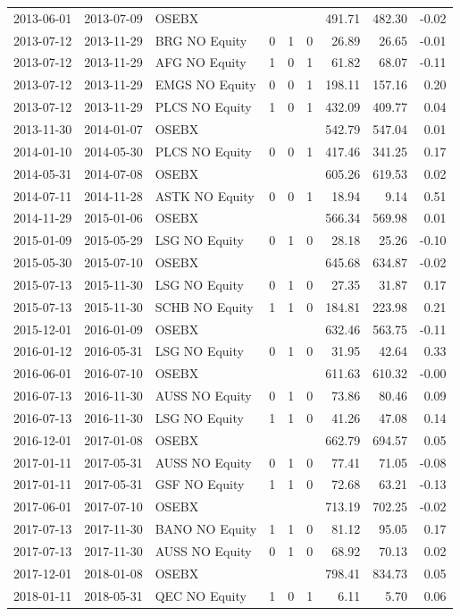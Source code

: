 \begin{appendices}
\begin{table}[h]
\begin{tabular}{llllllrrr}
   2013-06-01 & 2013-07-09 & OSEBX &  &  &  & 491.71 & 482.30 & -0.02 \\ 
   2013-07-12 & 2013-11-29 & BRG NO Equity & 0 & 1 & 0 & 26.89 & 26.65 & -0.01 \\ 
   2013-07-12 & 2013-11-29 & AFG NO Equity & 1 & 0 & 1 & 61.82 & 68.07 & -0.11 \\ 
   2013-07-12 & 2013-11-29 & EMGS NO Equity & 0 & 0 & 1 & 198.11 & 157.16 & 0.20 \\ 
   2013-07-12 & 2013-11-29 & PLCS NO Equity & 1 & 0 & 1 & 432.09 & 409.77 & 0.04 \\ 
   2013-11-30 & 2014-01-07 & OSEBX &  &  &  & 542.79 & 547.04 & 0.01 \\ 
   2014-01-10 & 2014-05-30 & PLCS NO Equity & 0 & 0 & 1 & 417.46 & 341.25 & 0.17 \\ 
   2014-05-31 & 2014-07-08 & OSEBX &  &  &  & 605.26 & 619.53 & 0.02 \\ 
   2014-07-11 & 2014-11-28 & ASTK NO Equity & 0 & 0 & 1 & 18.94 & 9.14 & 0.51 \\ 
   2014-11-29 & 2015-01-06 & OSEBX &  &  &  & 566.34 & 569.98 & 0.01 \\ 
   2015-01-09 & 2015-05-29 & LSG NO Equity & 0 & 1 & 0 & 28.18 & 25.26 & -0.10 \\ 
   2015-05-30 & 2015-07-10 & OSEBX &  &  &  & 645.68 & 634.87 & -0.02 \\ 
   2015-07-13 & 2015-11-30 & LSG NO Equity & 0 & 1 & 0 & 27.35 & 31.87 & 0.17 \\ 
   2015-07-13 & 2015-11-30 & SCHB NO Equity & 1 & 1 & 0 & 184.81 & 223.98 & 0.21 \\ 
   2015-12-01 & 2016-01-09 & OSEBX &  &  &  & 632.46 & 563.75 & -0.11 \\ 
   2016-01-12 & 2016-05-31 & LSG NO Equity & 0 & 1 & 0 & 31.95 & 42.64 & 0.33 \\ 
   2016-06-01 & 2016-07-10 & OSEBX &  &  &  & 611.63 & 610.32 & -0.00 \\ 
   2016-07-13 & 2016-11-30 & AUSS NO Equity & 0 & 1 & 0 & 73.86 & 80.46 & 0.09 \\ 
   2016-07-13 & 2016-11-30 & LSG NO Equity & 1 & 1 & 0 & 41.26 & 47.08 & 0.14 \\ 
   2016-12-01 & 2017-01-08 & OSEBX &  &  &  & 662.79 & 694.57 & 0.05 \\ 
   2017-01-11 & 2017-05-31 & AUSS NO Equity & 0 & 1 & 0 & 77.41 & 71.05 & -0.08 \\ 
   2017-01-11 & 2017-05-31 & GSF NO Equity & 1 & 1 & 0 & 72.68 & 63.21 & -0.13 \\ 
   2017-06-01 & 2017-07-10 & OSEBX &  &  &  & 713.19 & 702.25 & -0.02 \\ 
   2017-07-13 & 2017-11-30 & BANO NO Equity & 1 & 1 & 0 & 81.12 & 95.05 & 0.17 \\ 
   2017-07-13 & 2017-11-30 & AUSS NO Equity & 0 & 1 & 0 & 68.92 & 70.13 & 0.02 \\ 
   2017-12-01 & 2018-01-08 & OSEBX &  &  &  & 798.41 & 834.73 & 0.05 \\ 
   2018-01-11 & 2018-05-31 & QEC NO Equity & 1 & 0 & 1 & 6.11 & 5.70 & 0.06 \\ 


\end{tabular}
\end{table}
\end{appendices}
